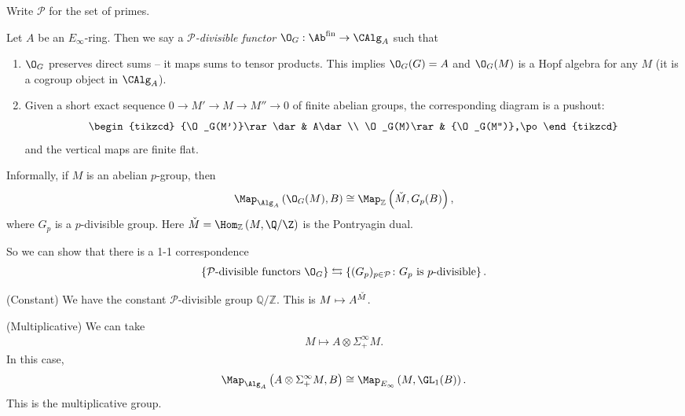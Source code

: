 \begin{notation} Write $\mathcal{P}$ for the set of primes.
\end{notation}

\begin{definition} Let $A$ be an $E_\infty$-ring. Then we say a $\mathcal{P}$\textit{-divisible functor} $\O_G: \Ab^{\text{fin}} \to \CAlg_A$ such that
\begin{enumerate}
    \item $\O_G$ preserves direct sums -- it maps sums to tensor products. This implies $\O_G(G) = A$ and $\O_G(M)$ is a Hopf algebra for any $M$ (it is a cogroup object in $\CAlg_A$).
    
    \item Given a short exact sequence $0 \to M' \to M \to M'' \to 0$ of finite abelian groups, the corresponding diagram is a pushout:
\[ \begin{tikzcd}
    {\O_G(M')}\rar\dar & A\dar\\
    \O_G(M)\rar & {\O_G(M'')},\po
\end{tikzcd} \]
and the vertical maps are finite flat.
\end{enumerate}
\end{definition}

Informally, if $M$ is an abelian $p$-group, then
\begin{align*}
    \Map_{\Alg_A} \left( \O_G(M), B \right) \cong \Map_\mathbb{Z} \left( \v{M}, G_p(B) \right),
\end{align*}
where $G_p$ is a $p$-divisible group. Here $\v{M} = \Hom_\mathbb{Z} \left( M, \Q/\Z \right)$ is the Pontryagin dual.

So we can show that there is a 1-1 correspondence
\begin{align*}
    \left\{ \mathcal{P}\text{-divisible functors } \O_G \right\} \leftrightarrows \left\{ (G_p)_{p\in \mathcal{P}} \colon G_p \text{ is } p\text{-divisible} \right\}.
\end{align*}

\begin{example} (Constant) We have the constant $\mathcal{P}$-divisible group $\mathbb{Q}/\mathbb{Z}$. This is $M \mapsto A^{\check{M}}$.
\end{example}

\begin{example} (Multiplicative) We can take
\begin{align*}
    M \mapsto A \otimes \Sigma_+^\infty M.
\end{align*}
In this case,
\begin{align*}
    \Map_{\Alg_A} \left( A \otimes \Sigma_+^\infty M, B \right) \cong \Map_{E_\infty} \left( M, \GL_1(B) \right).
\end{align*}
This is the multiplicative group.
\end{example}

